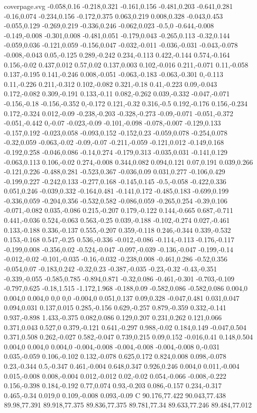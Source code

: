 \begin{filecontents}[noheader]{coverpage.svg}
-0.058,0.16 -0.218,0.321 -0.161,0.156 -0.481,0.203 -0.641,0.281 -0.16,0.074 -0.234,0.156 -0.172,0.375 0.063,0.219 0.008,0.328 -0.043,0.453 -0.055,0.129 -0.269,0.219 -0.336,0.246 -0.062,0.023 -0.5,0 -0.644,-0.008 -0.149,-0.008 -0.301,0.008 -0.481,0.051 -0.179,0.043 -0.265,0.113 -0.32,0.144 -0.059,0.036 -0.121,0.059 -0.156,0.047 -0.032,-0.011 -0.036,-0.031 -0.043,-0.078 -0.008,-0.043 0.05,-0.125 0.289,-0.242 0.234,-0.113 0.422,-0.144 0.574,-0.164 0.156,-0.02 0.437,0.012 0.57,0.02 0.137,0.003 0.102,-0.016 0.211,-0.071 0.11,-0.058 0.137,-0.195 0.141,-0.246 0.008,-0.051 -0.063,-0.183 -0.063,-0.301 0,-0.113 0.11,-0.226 0.211,-0.312 0.102,-0.082 0.321,-0.18 0.41,-0.223 0.09,-0.043 0.172,-0.082 0.309,-0.191 0.133,-0.11 0.082,-0.262 0.039,-0.332 -0.047,-0.071 -0.156,-0.18 -0.156,-0.352 0,-0.172 0.121,-0.32 0.316,-0.5 0.192,-0.176 0.156,-0.234 0.172,-0.324 0.012,-0.09 -0.238,-0.203 -0.328,-0.273 -0.09,-0.071 -0.051,-0.372 -0.051,-0.442 0,-0.07 -0.023,-0.09 -0.101,-0.098 -0.078,-0.007 -0.129,0.133 -0.157,0.192 -0.023,0.058 -0.093,0.152 -0.152,0.23 -0.059,0.078 -0.254,0.078 -0.32,0.059 -0.063,-0.02 -0.09,-0.07 -0.211,-0.059 -0.121,0.012 -0.149,0.168 -0.192,0.258 -0.046,0.086 -0.14,0.274 -0.179,0.313 -0.035,0.031 -0.141,0.129 -0.063,0.113 0.106,-0.02 0.274,-0.008 0.344,0.082 0.094,0.121 0.07,0.191 0.039,0.266 -0.121,0.226 -0.488,0.281 -0.523,0.367 -0.036,0.09 0.031,0.277 -0.106,0.429 -0.199,0.227 -0.242,0.133 -0.277,0.168 -0.145,0.145 -0.5,-0.058 -0.422,0.336 0.051,0.246 -0.039,0.332 -0.164,0.481 -0.141,0.172 -0.485,0.183 -0.699,0.199 -0.336,0.059 -0.204,0.356 -0.532,0.582 -0.086,0.059 -0.265,0.254 -0.39,0.106 -0.071,-0.082 0.035,-0.086 0.215,-0.207 0.179,-0.122 0.144,-0.665 0.687,-0.711 0.441,-0.036 0.524,-0.063 0.563,-0.25 0.039,-0.188 -0.102,-0.274 0.027,-0.461 0.133,-0.188 0.336,-0.137 0.555,-0.207 0.359,-0.118 0.246,-0.344 0.339,-0.532 0.153,-0.168 0.547,-0.25 0.536,-0.336 -0.012,-0.086 -0.114,-0.113 -0.176,-0.117 -0.199,0.008 -0.356,0.02 -0.524,-0.047 -0.097,-0.039 -0.136,-0.047 -0.199,-0.14 -0.012,-0.02 -0.101,-0.035 -0.16,-0.032 -0.238,0.008 -0.461,0.286 -0.52,0.356 -0.054,0.07 -0.183,0.242 -0.32,0.23 -0.387,-0.035 -0.23,-0.32 -0.43,-0.351 -0.339,-0.055 -0.585,0.785 -0.894,0.871 -0.32,0.086 -0.461,-0.301 -0.703,-0.109 -0.797,0.625 -0.18,1.515 -1.172,1.968 -0.188,0.09 -0.582,0.086 -0.582,0.086 0.004,0 0.004,0 0.004,0 0,0 0,0 -0.004,0 0.051,0.137 0.09,0.328 -0.047,0.481 0.031,0.047 0.094,0.031 0.137,0.015 0.285,-0.156 0.629,-0.257 0.879,-0.359 0.332,-0.141 0.937,-0.898 1.433,-0.375 0.082,0.086 0.129,0.207 0.231,0.262 0.121,0.066 0.371,0.043 0.527,0 0.379,-0.121 0.641,-0.297 0.988,-0.02 0.184,0.149 -0.047,0.504 0.371,0.508 0.262,-0.027 0.582,-0.047 0.739,0.215 0.09,0.152 -0.016,0.41 0.148,0.504 0.004,0 0.004,0 0.004,0 -0.004,-0.008 -0.004,-0.008 -0.004,-0.008 0,-0.031 0.035,-0.059 0.106,-0.102 0.132,-0.078 0.625,0.172 0.824,0.008 0.098,-0.078 0.23,-0.344 0.5,-0.347 0.461,-0.004 0.648,0.347 0.926,0.246 0.004,0 0.011,-0.004 0.015,-0.008 0.008,-0.004 0.012,-0.012 0.02,-0.02 0.054,-0.066 -0.008,-0.222 0.156,-0.398 0.184,-0.192 0.77,0.074 0.93,-0.203 0.086,-0.157 0.234,-0.317 0.465,-0.34 0.019,0 0.109,-0.008 0.093,-0.09 C 90.176,77.422 90.043,77.438 89.98,77.391 89.918,77.375 89.836,77.375 89.781,77.34 89.633,77.246 89.484,77.012 
\end{filecontents}
